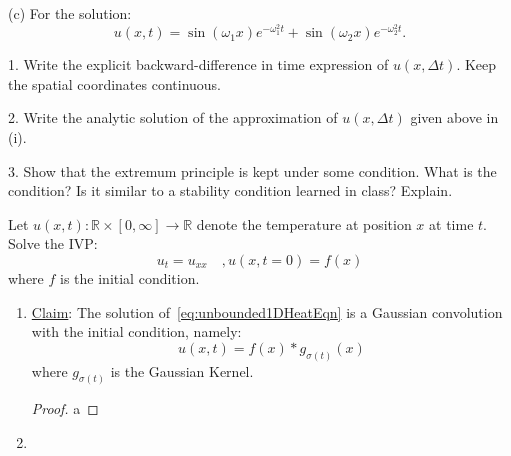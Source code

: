 \documentclass{article}
\begin{document}
(c) For the solution:
\[
  u(x,t) = \sin(\omega_1 x)e^{-\omega_1^2 t} + \sin(\omega_2 x)e^{-\omega_2^2 t}.
\]

1. Write the explicit backward-difference in time expression of \(u(x, \Delta t)\). Keep the spatial coordinates continuous.

2. Write the analytic solution of the approximation of \(u(x, \Delta t)\) given above in (i).

3. Show that the extremum principle is kept under some condition. What is the condition? Is it similar to a stability condition learned in class? Explain.





Let $u(x,t): \mathbb{R} \times [0, \infty] \to \mathbb{R}$ denote the temperature at position $x$ at time $t$. Solve the IVP:
\begin{equation} \label{eq:unbounded1DHeatEqn}
  u_{t} = u_{xx} \quad, u(x,t=0) = f(x)
\end{equation}
where $f$ is the initial condition. 

\begin{enumerate}[label=\alph*), ref=\alph*]
\item \ul{Claim}: The solution of~\cref{eq:unbounded1DHeatEqn} is a Gaussian convolution with the initial condition, namely:
\[
  u(x,t) = f(x) \ast g_{\sigma(t)} (x)
\]
where $g_{\sigma(t)}$ is the Gaussian Kernel. 

\begin{proof}
a
\end{proof}

  \item 
\end{enumerate}
\end{document}
